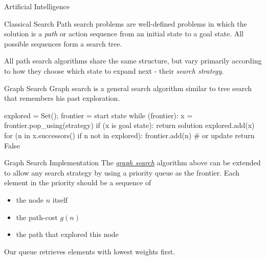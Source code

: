 \documentclass{cognito}
\begin{document}
\lstset{language=Python}
\lstset{mathescape=true}


\begin{note}{Artificial Intelligence}
\end{note}



\begin{note}{Classical Search}
	Path search problems are well-defined problems in which the solution is a \emph{path}
	or action sequence from an initial state to a goal state. All possible
	sequences form a search tree.
	\vspace{5pt}
	
	All path search algorithms share the same structure, but vary primarily
	according to how they choose which state to expand next - their \emph{search strategy}.
\end{note}


\begin{note}{Graph Search}
	Graph search is a general search algorithm
	similar to  tree search that remembers his past exploration.
	\begin{largecode}
explored = Set(); frontier = {start state}
while (frontier):
 	x = frontier.pop_using(strategy)
	if (x is goal state): return solution
	explored.add(x)
	for (n in x.successors() if n not in explored):
		frontier.add(n)  # or update
return False
	\end{largecode}
	\vspace{-5pt}
\end{note}

\begin{note}{Graph Search Implementation}
	The \hyperref[note:Graph Search]{\emph{graph search}} algorithm above can be extended to allow any 
	search strategy by using a priority queue as the frontier. Each element in the
	priority should be a sequence of
	\begin{itemize}
		\item the node $n$ itself
		\item the path-cost $g(n)$
		\item the path that explored this node
	\end{itemize}
	\begin{remark} Our queue retrieves elements with lowest weights first.
	\end{remark}
	\vspace{-5pt}
\end{note}
\end{document}
